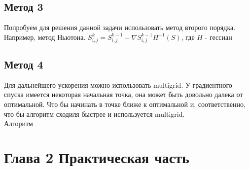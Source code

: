 \documentclass[ 12pt,x11names]{article}
\begin{document}
    \subsection{Метод 3}
    Попробуем для решения данной задачи использовать метод второго порядка. Например, метод Ньютона.
     $S^k_{i, j} = S^{k-1}_{i, j} - \nabla S^{k-1}_{i, j} H^{-1}(S)$, где $H$ - гессиан
    \subsection{Метод 4}
    Для дальнейшего ускорения можно использовать multigrid.
    У градиентного спуска имеется некоторая начальная точка, она может быть довольно далека от оптимальной.
    Что бы начинать в точке ближе к оптимальной и, соответственно, что бы алгоритм сходиля быстрее и  используется multigrid.\\
    Алгоритм
    \newpage
    \section{
    Глава 2
    Практическая часть}
\end{document}
